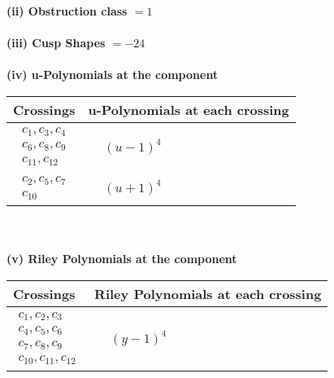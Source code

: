\documentclass[1p]{elsarticle_modified}
\theoremstyle{definition}
\begin{document}
\flushleft \textbf{(ii) Obstruction class $= 1$}\\~\\
\flushleft \textbf{(iii) Cusp Shapes $= -24$}\\~\\
\newpage\renewcommand{\arraystretch}{1}
\flushleft \textbf{(iv) u-Polynomials at the component}\newline \\
\begin{tabular}{m{50pt}|m{274pt}}
Crossings & \hspace{64pt}u-Polynomials at each crossing \\
\hline $$\begin{aligned}c_{1},c_{3},c_{4}\\c_{6},c_{8},c_{9}\\c_{11},c_{12}\end{aligned}$$&$\begin{aligned}
&(u-1)^4
\end{aligned}$\\
\hline $$\begin{aligned}c_{2},c_{5},c_{7}\\c_{10}\end{aligned}$$&$\begin{aligned}
&(u+1)^4
\end{aligned}$\\
\hline
\end{tabular}\\~\\
\newpage\renewcommand{\arraystretch}{1}
\flushleft \textbf{(v) Riley Polynomials at the component}\newline \\
\begin{tabular}{m{50pt}|m{274pt}}
Crossings & \hspace{64pt}Riley Polynomials at each crossing \\
\hline $$\begin{aligned}c_{1},c_{2},c_{3}\\c_{4},c_{5},c_{6}\\c_{7},c_{8},c_{9}\\c_{10},c_{11},c_{12}\end{aligned}$$&$\begin{aligned}
&(y-1)^4
\end{aligned}$\\
\hline
\end{tabular}\\~\\
\end{document}
